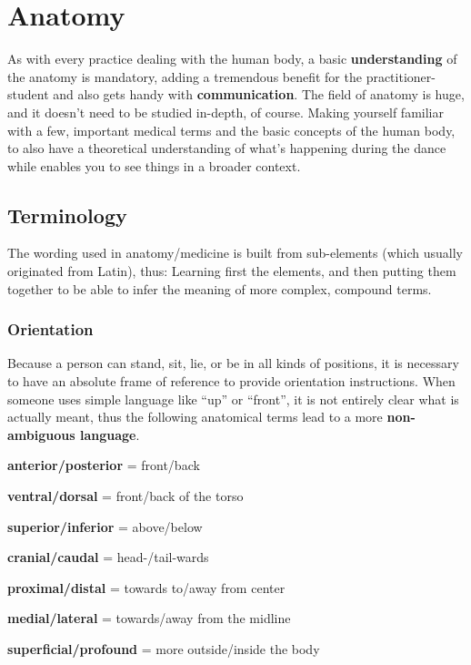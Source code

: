 \chapter{Anatomy}\label{ch:anatomy}


As with every practice dealing with the human body, a basic \textbf{understanding} of the anatomy is mandatory, adding a tremendous benefit for the practitioner-student and also gets handy with \textbf{communication}.
The field of anatomy is huge, and it doesn't need to be studied in-depth, of course.
Making yourself familiar with a few, important medical terms and the basic concepts of the human body, to also have a theoretical understanding of what's happening during the dance while enables you to see things in a broader context.

\section{Terminology}\label{sec:terminology}

The wording used in anatomy/medicine is built from sub-elements (which usually originated from Latin), thus:
Learning first the elements, and then putting them together to be able to infer the meaning of more complex, compound terms.

\subsection{Orientation}

Because a person can stand, sit, lie, or be in all kinds of positions, it is necessary to have an absolute frame of reference to provide orientation instructions.
When someone uses simple language like ``up'' or ``front'', it is not entirely clear what is actually meant, thus the following anatomical terms lead to a more \textbf{non-ambiguous language}.

\begin{itemize*}
    \item \textbf{anterior/posterior} = front/back
    \item \textbf{ventral/dorsal} = front/back of the torso
    \item \textbf{superior/inferior} = above/below
    \item \textbf{cranial/caudal} = head-/tail-wards
    \item \textbf{proximal/distal} = towards to/away from center
    \item \textbf{medial/lateral} = towards/away from the midline
    \item \textbf{superficial/profound} = more outside/inside the body
\end{itemize*}

